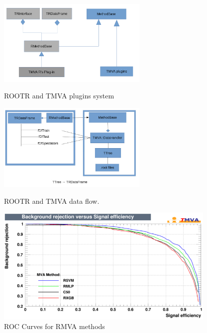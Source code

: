 \documentclass[a4paper]{jpconf}
\begin{document}
\begin{figure}[h]
\centering
\begin{minipage}{15pc}
\includegraphics[width=17pc]{img/rmvaplugins.png}
\caption{\label{rmvaplug}ROOTR and TMVA plugins system}
\end{minipage}\hspace{2pc}%
\begin{minipage}{15pc}
\includegraphics[width=17pc]{img/rmvadf.jpg}
\caption{\label{rmvadf}ROOTR and TMVA data flow.}
\end{minipage}\hspace{2pc}%
\vspace{2pc}%
\includegraphics[width=25pc]{img/rmvaroc.png}\caption{\label{rmvaroc} ROC Curves for RMVA methods}
\end{figure}
\end{document}
